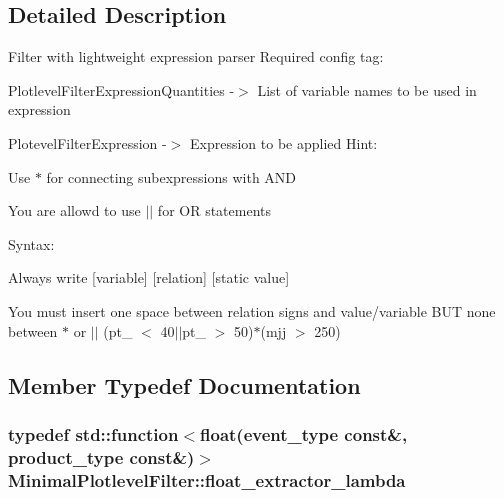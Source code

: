 \subsection{Detailed Description}
Filter with lightweight expression parser Required config tag:
\begin{DoxyItemize}
\item PlotlevelFilterExpressionQuantities -\/$>$ List of variable names to be used in expression
\item PlotevelFilterExpression -\/$>$ Expression to be applied Hint:
\end{DoxyItemize}

Use $\ast$ for connecting subexpressions with AND
\begin{DoxyItemize}
\item You are allowd to use $|$$|$ for OR statements
\item Syntax:
\item Always write \mbox{[}variable\mbox{]} \mbox{[}relation\mbox{]} \mbox{[}static value\mbox{]}
\item You must insert one space between relation signs and value/variable BUT none between $\ast$ or $|$$|$ (pt\_ $<$ 40$|$$|$pt\_ $>$ 50)$\ast$(mjj $>$ 250) 
\end{DoxyItemize}

\subsection{Member Typedef Documentation}
\hypertarget{classMinimalPlotlevelFilter_aa163bb0b63ea3977ac16ae1d93c212da}{
\subsubsection[{float\_\-extractor\_\-lambda}]{\setlength{\rightskip}{0pt plus 5cm}typedef std::function$<$float(event\_\-type const\&, product\_\-type const\&)$>$ {\bf MinimalPlotlevelFilter::float\_\-extractor\_\-lambda}}}
\label{classMinimalPlotlevelFilter_aa163bb0b63ea3977ac16ae1d93c212da}


